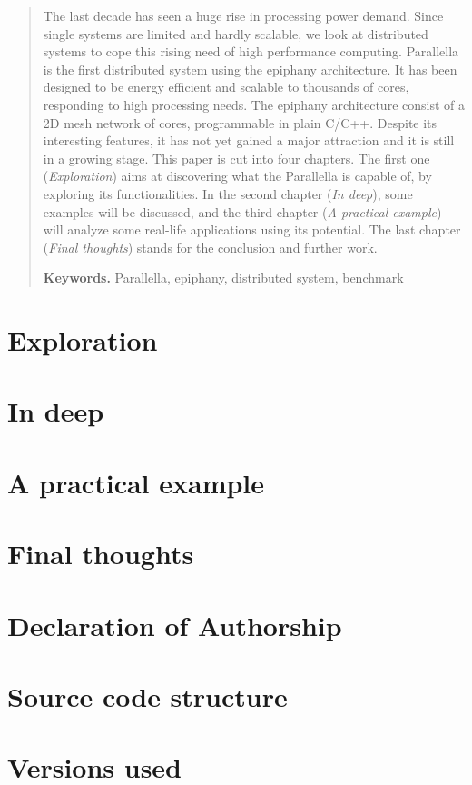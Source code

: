 \begin{abstract}

The last decade has seen a huge rise in processing power demand. Since single systems are limited and hardly scalable, we look at distributed systems to cope this rising need of high performance computing. Parallella is the first distributed system using the \gls{epiphany} architecture. It has been designed to be energy efficient and scalable to thousands of cores, responding to high processing needs. The \gls{epiphany} architecture consist of a 2D mesh network of cores, programmable in plain C/C++. Despite its interesting features, it has not yet gained a major attraction and it is still in a growing stage. This paper is cut into four chapters. The first one (\textit{Exploration}) aims at discovering what the Parallella is capable of, by exploring its functionalities. In the second chapter (\textit{In deep}), some examples will be discussed, and the third chapter (\textit{A practical example}) will analyze some real-life applications using its potential. The last chapter (\textit{Final thoughts}) stands for the conclusion and further work.

\smallskip
\noindent \textbf{Keywords.} Parallella, \gls{epiphany}, distributed system, benchmark

\end{abstract}

\printglossaries

\tableofcontents
\listoffigures

\chapter{Exploration}


\chapter{In deep}


\chapter{A practical example}


\chapter{Final thoughts}


\printbibliography

\chapter*{Declaration of Authorship}


\appendix
\chapter{Source code structure}


\chapter{Versions used}




